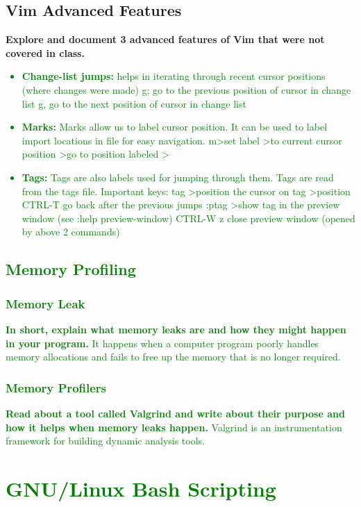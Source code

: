 \documentclass{article}
\begin{document}
\subsection{Vim Advanced Features}
\textbf{Explore and document 3 advanced features of Vim that were not covered in class.}
\textcolor{green}{\begin{itemize}
    \item \textbf{Change-list jumps:} helps in iterating through recent cursor positions (where changes were made)
    g; go to the previous position of cursor in change list
    g, go to the next position of cursor in change list
    \item \textbf{Marks:} Marks allow us to label cursor position. It can be used to label import
    locations in file for easy navigation.
    m\textlesschar\textgreater set label \textlesschar\textgreater to current cursor position
     \textlesschar\textgreater go to position labeled \textlesschar\textgreater
    \item \textbf{Tags:} Tags are also labels used for jumping through them. Tags are read from the
    tags file.
    Important keys:
    tag \textlesstagname\textgreater position the cursor on tag \textlesstagname\textgreater position
    CTRL-T go back after the previous jumps
    :ptag \textlesstagname\textgreater show tag in the preview window (see :help preview-window)
    CTRL-W z close preview window (opened by above 2 commands)\end{itemize}
\subsection{Memory Profiling}
\subsubsection{Memory Leak}
\textbf{In short, explain what memory leaks are and how they might happen in your program.}
\textcolor{green}{
    It happens when a computer program poorly handles memory allocations and fails to free up the memory that is no longer required.}
\subsubsection{Memory Profilers}
\textbf{Read about a tool called Valgrind and write about their purpose and how it helps when memory leaks happen.}
\textcolor{green}{
    Valgrind is an instrumentation framework for building dynamic analysis tools.
}
\section{GNU/Linux Bash Scripting}
}
\end{document}
